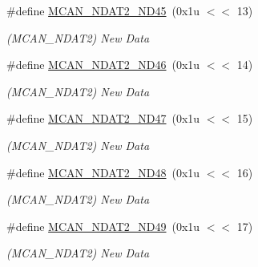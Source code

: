 \begin{DoxyCompactItemize}
\mbox{\label{group__SAME70__MCAN_gae13c0e7d2ff60cf79f2a11e2f511c303}} 
\#define \mbox{\hyperlink{group__SAME70__MCAN_gae13c0e7d2ff60cf79f2a11e2f511c303}{M\+C\+A\+N\+\_\+\+N\+D\+A\+T2\+\_\+\+N\+D45}}~(0x1u $<$$<$ 13)
\begin{DoxyCompactList}\small\item\em (M\+C\+A\+N\+\_\+\+N\+D\+A\+T2) New Data \end{DoxyCompactList}\item 
\mbox{\label{group__SAME70__MCAN_ga9e3c8266472b70c790073ad17f9bb62c}} 
\#define \mbox{\hyperlink{group__SAME70__MCAN_ga9e3c8266472b70c790073ad17f9bb62c}{M\+C\+A\+N\+\_\+\+N\+D\+A\+T2\+\_\+\+N\+D46}}~(0x1u $<$$<$ 14)
\begin{DoxyCompactList}\small\item\em (M\+C\+A\+N\+\_\+\+N\+D\+A\+T2) New Data \end{DoxyCompactList}\item 
\mbox{\label{group__SAME70__MCAN_gaa0d2083012edd18144fe727156fa1937}} 
\#define \mbox{\hyperlink{group__SAME70__MCAN_gaa0d2083012edd18144fe727156fa1937}{M\+C\+A\+N\+\_\+\+N\+D\+A\+T2\+\_\+\+N\+D47}}~(0x1u $<$$<$ 15)
\begin{DoxyCompactList}\small\item\em (M\+C\+A\+N\+\_\+\+N\+D\+A\+T2) New Data \end{DoxyCompactList}\item 
\mbox{\label{group__SAME70__MCAN_gad6fee0fbf3efb4e27a17931e190eec55}} 
\#define \mbox{\hyperlink{group__SAME70__MCAN_gad6fee0fbf3efb4e27a17931e190eec55}{M\+C\+A\+N\+\_\+\+N\+D\+A\+T2\+\_\+\+N\+D48}}~(0x1u $<$$<$ 16)
\begin{DoxyCompactList}\small\item\em (M\+C\+A\+N\+\_\+\+N\+D\+A\+T2) New Data \end{DoxyCompactList}\item 
\mbox{\label{group__SAME70__MCAN_gac0bdeebfabb534fe98d555a51b9e8554}} 
\#define \mbox{\hyperlink{group__SAME70__MCAN_gac0bdeebfabb534fe98d555a51b9e8554}{M\+C\+A\+N\+\_\+\+N\+D\+A\+T2\+\_\+\+N\+D49}}~(0x1u $<$$<$ 17)
\begin{DoxyCompactList}\small\item\em (M\+C\+A\+N\+\_\+\+N\+D\+A\+T2) New Data \end{DoxyCompactList}\item 
$$
\end{DoxyCompactItemize}
